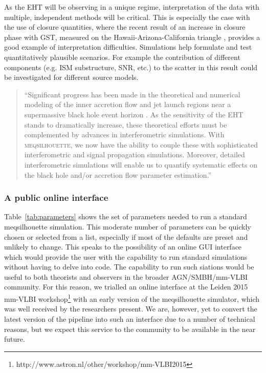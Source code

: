 As the EHT will be observing in a unique regime, interpretation of the data with multiple, independent methods will be critical. This is especially the case with the use of closure quantities, where the recent result of an increase in closure phase with GST, measured on the Hawaii-Arizona-California triangle \citep{Fish_2016}, provides a good example of interpretation difficulties. Simulations help formulate and test quantitatively plausible scenarios. For example the contribution of different components (e.g. ISM substructure, SNR, etc.) to the scatter in this result could be investigated for different source models. 

\begin{quotation}
``Significant progress has been made in the theoretical and numerical modeling of the inner accretion flow and jet launch regions near a supermassive black hole event horizon
\citep[e.g.][]{Zanna_2007,Etienne_2010,Dexter_2013,Moscibrodzka_2014, McKinney_2014}. As the sensitivity of the EHT stands to dramatically increase, these theoretical efforts must be complemented by advances in interferometric simulations. With \textsc{meqsilhouette}, we now have the ability to couple these with sophisticated interferometric and signal propagation simulations.  Moreover, detailed interferometric simulations will enable us to quantify systematic effects on the black hole and/or accretion flow parameter estimation.''\\
\citep{Blecher_2016}
\end{quotation}



\subsubsection{A public online interface}
Table~\ref{tab:parameters} shows the set of parameters needed to run a standard {\sc meqsilhouette} simulation. This moderate number of parameters can be quickly chosen or selected from a list, especially if most of the defaults are preset and unlikely to change. This speaks to the possibility of an online GUI interface which would provide the user with the capability to run standard simulations without having to delve into code. The capability to run such siations would be useful to both theorists and observers in the broader AGN/SMBH/mm-VLBI community. For this reason, we trialled an online interface at the Leiden 2015 mm-VLBI workshop\footnote{http://www.astron.nl/other/workshop/mm-VLBI2015} with an early version of the {\sc meqsilhouette} simulator, which was well received by the researchers present. We are, however, yet to convert the latest version of the pipeline \citep{Blecher_2016} into such an interface due to a number of technical reasons, but we expect this service to the community to be available in the near future.


